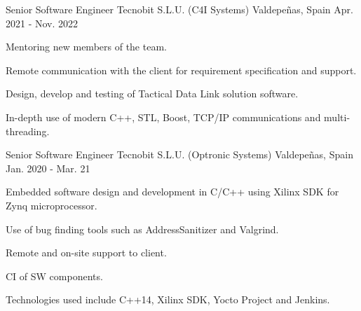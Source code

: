 

\begin{cventries}

  \cventry
    {Senior Software Engineer} %
    {Tecnobit S.L.U. (C4I Systems)} %
    {Valdepeñas, Spain} %
    {Apr. 2021 - Nov. 2022} %
    {
      \begin{cvitems} %
        \item {Mentoring new members of the team.}
        \item {Remote communication with the client for requirement specification and support.}
        \item {Design, develop and testing of Tactical Data Link solution software.}
        \item {In-depth use of modern C++, STL, Boost, TCP/IP communications and multi-threading.}
      \end{cvitems}
    }

  \cventry
    {Senior Software Engineer} %
    {Tecnobit S.L.U. (Optronic Systems)} %
    {Valdepeñas, Spain} %
    {Jan. 2020 - Mar. 21} %
    {
      \begin{cvitems} %
        \item {Embedded software design and development in C/C++ using Xilinx SDK for Zynq microprocessor.}
        \item {Use of bug finding tools such as AddressSanitizer and Valgrind. }
        \item {Remote and on-site support to client.}
        \item {CI of SW components.}
        \item {Technologies used include C++14, Xilinx SDK, Yocto Project and Jenkins.}
      \end{cvitems}
    }


\end{cventries}
